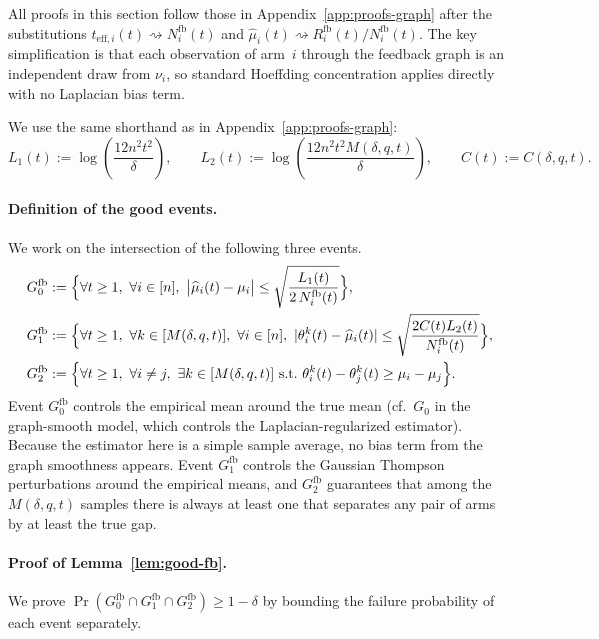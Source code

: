 \documentclass{article}
\begin{document}
All proofs in this section follow those in Appendix~\ref{app:proofs-graph} after the substitutions $t_{\mathrm{eff},i}(t)\rightsquigarrow N_i^{\mathrm{fb}}(t)$ and $\widehat\mu_i(t)\rightsquigarrow R_i^{\mathrm{fb}}(t)/N_i^{\mathrm{fb}}(t)$. The key simplification is that each observation of arm~$i$ through the feedback graph is an independent draw from $\nu_i$, so standard Hoeffding concentration applies directly with no Laplacian bias term.

We use the same shorthand as in Appendix~\ref{app:proofs-graph}:
\[
L_1(t):=\log\!\left(\frac{12n^2t^2}{\delta}\right),
\qquad
L_2(t):=\log\!\left(\frac{12n^2t^2M(\delta,q,t)}{\delta}\right),
\qquad
C(t):=C(\delta,q,t).
\]

\paragraph{Definition of the good events.}
We work on the intersection of the following three events.
\begin{align*}
G_0^{\mathrm{fb}}
&:=
\Bigl\{
\forall t\ge 1,\ \forall i\in[n],\
\bigl|\widehat\mu_i(t)-\mu_i\bigr|\le \sqrt{\frac{L_1(t)}{2\,N_i^{\mathrm{fb}}(t)}}
\Bigr\},\\
G_1^{\mathrm{fb}}
&:=
\Bigl\{
\forall t\ge 1,\ \forall k\in[M(\delta,q,t)],\ \forall i\in[n],\
|\theta_i^k(t)-\widehat\mu_i(t)|
\le
\sqrt{\frac{2C(t)L_2(t)}{N_i^{\mathrm{fb}}(t)}}
\Bigr\},\\
G_2^{\mathrm{fb}}
&:=
\Bigl\{
\forall t\ge 1,\ \forall i\neq j,\ \exists k\in[M(\delta,q,t)]
\text{ s.t.\ }
\theta_i^k(t)-\theta_j^k(t)\ge \mu_i-\mu_j
\Bigr\}.
\end{align*}
Event $G_0^{\mathrm{fb}}$ controls the empirical mean around the true mean (cf.\ $G_0$ in the graph-smooth model, which controls the Laplacian-regularized estimator). Because the estimator here is a simple sample average, no bias term from the graph smoothness appears. Event $G_1^{\mathrm{fb}}$ controls the Gaussian Thompson perturbations around the empirical means, and $G_2^{\mathrm{fb}}$ guarantees that among the $M(\delta,q,t)$ samples there is always at least one that separates any pair of arms by at least the true gap.

\paragraph{Proof of Lemma~\ref{lem:good-fb}.}
We prove $\Pr(G_0^{\mathrm{fb}}\cap G_1^{\mathrm{fb}}\cap G_2^{\mathrm{fb}})\ge 1-\delta$ by bounding the failure probability of each event separately.
\end{document}
